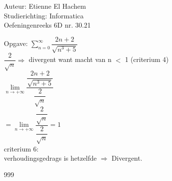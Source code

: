 \documentclass[a4paper]{article}
\begin{document}
  
\noindent \large Auteur: Etienne El Hachem \\
\noindent \large Studierichting: Informatica\\
\noindent \large Oefeningenreeks 6D nr. 30.21\\

\medskip

\normalsize
Opgave: $\displaystyle\sum_{n=0}^{\infty} \dfrac{2n+2}{\sqrt{n^3+5}}$ \\

$\dfrac{2}{\sqrt{n}} \Rightarrow$ divergent want macht van n $<$ 1 (criterium 4) \\

$\lim\limits_{n \rightarrow +\infty} \dfrac{\dfrac{2n+2}{\sqrt{n^3+5}}}{\dfrac{2}{\sqrt{n}}}$ \\

$ = \lim\limits_{n \rightarrow +\infty} \dfrac{\dfrac{2}{\sqrt{n}}}{\dfrac{2}{\sqrt{n}}} = 1$ \\

criterium 6: \\

verhoudingsgedrags is hetzelfde $\Rightarrow$ Divergent.

\begin{thebibliography}{999}
\end{thebibliography}
\end{document}
